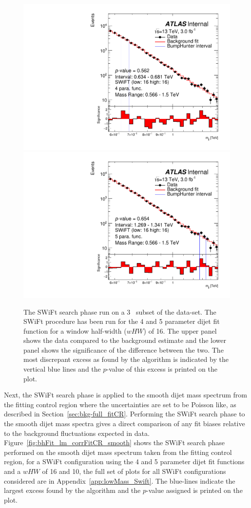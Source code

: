 \begin{figure}[!htb]
  \vspace{-1.5mm}
\captionsetup[subfigure]{aboveskip=0pt,justification=centering}
\centering
{} {
  \includegraphics[width=0.42\linewidth, angle=0]{figs/Dibjet/LowMass/FitStudy_min566/bhFit_subset_4para_low16_high16.pdf}
}
 {
  \includegraphics[width=0.42\linewidth, angle=0]{figs/Dibjet/LowMass/FitStudy_min566/bhFit_subset_5para_low16_high16.pdf}
}
\caption{\label{fig:bhFit_lm_subset}
  The SWiFt search phase run on a 3~\ifb{} subset of the \lm{} data-set.
  The SWiFt procedure has been run for the 4 and 5 parameter dijet fit function for a window half-width ($wHW$) of 16.
  The upper panel shows the data compared to the background estimate and the lower panel shows the significance of the difference between the two.
  The most discrepant excess as found by the \bh{} algorithm is indicated by the vertical blue lines and the \mbox{$p$-value} of this excess is printed on the plot. }
\end{figure}

Next, the SWiFt search phase is applied to the smooth dijet mass spectrum from the fitting control region
where the uncertainties are set to be Poisson like,
as described in Section~\ref{sec:bkg-full_fitCR}.
Performing the SWiFt search phase to the smooth dijet mass spectra gives a direct comparison
of any fit biases relative to the background fluctuations expected in data.
Figure~\ref{fig:bhFit_lm_corrFitCR_smooth} shows the SWiFt search phase
performed on the smooth dijet mass spectrum taken from the fitting control region,
for a SWiFt configuration using the 4 and 5 parameter dijet fit functions and a $wHW$ of 16 and 10,
the full set of plots for all SWiFt configurations considered are in Appendix~\ref{app:lowMass_Swift}.
The blue-lines indicate the largest excess found by the \bh{} algorithm and the \mbox{$p$-value} assigned is printed on the plot. 

